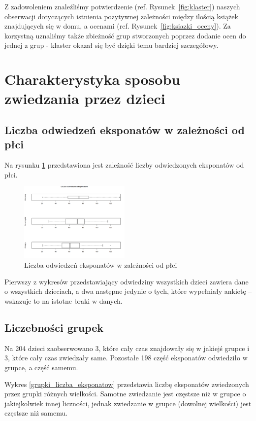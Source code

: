 \documentclass[conference]{IEEEtran}
\begin{document}
Z zadowoleniem znaleźliśmy potwierdzenie (ref. Rysunek~\ref{fig:klaster}) naszych obserwacji dotyczących istnienia pozytywnej zależności między ilością książek znajdujących się w domu, a ocenami (ref. Rysunek~\ref{fig:ksiazki_oceny}). Za korzystną uznaliśmy także zbieżność grup stworzonych poprzez dodanie ocen do jednej z grup - klaster okazał się być dzięki temu bardziej szczegółowy.


\section{Charakterystyka sposobu zwiedzania przez dzieci}
\subsection{Liczba odwiedzeń eksponatów w zależności od płci}
Na rysunku \ref{odwiedziny_plcie} przedstawiona jest zależność liczby odwiedzonych eksponatów od płci.
\begin{figure}[H]
\includegraphics[width=0.48\textwidth]{odwiedziny_plcie.png}
\caption{Liczba odwiedzeń eksponatów w zależności od płci}
\label{odwiedziny_plcie}
\end{figure}
Pierwszy z wykresów przedstawiający odwiedziny wszystkich dzieci zawiera dane o wszystkich dzieciach, a dwa następne jedynie o tych, które wypełniały ankietę -- wskazuje to na istotne braki w danych.

\subsection{Liczebności grupek}
Na 204 dzieci zaobserwowano 3, które cały czas znajdowały się w jakiejś grupce i 3, które cały czas zwiedzały same. Pozostałe 198 część eksponatów odwiedziło w grupce, a część samemu.

Wykres \ref{grupki_liczba_eksponatow} przedstawia liczbę eksponatów zwiedzonych przez grupki różnych wielkości. Samotne zwiedzanie jest częstsze niż w grupce o jakiejkolwiek innej liczności, jednak zwiedzanie w grupce (dowolnej wielkości) jest częstsze niż samemu.
\end{document}

